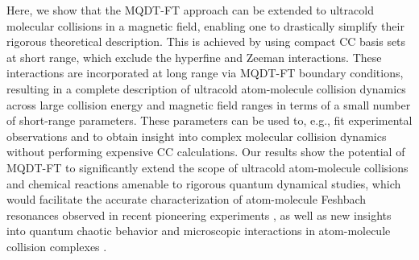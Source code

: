 \documentclass[reprint,amssymb,noeprint,twocolumn,longbibliography]{revtex4-2}
\begin{document}
Here, we show that the MQDT-FT approach can be extended to ultracold molecular collisions in a magnetic field, enabling one to drastically simplify their rigorous theoretical description. This is achieved by using compact CC basis sets at short range, which exclude the hyperfine and Zeeman interactions. These interactions are incorporated at long range via MQDT-FT boundary conditions, resulting in a complete description of ultracold atom-molecule collision dynamics across large collision energy and magnetic field ranges in terms of a small number of short-range parameters. %
These parameters can be used to, e.g., fit experimental observations and to obtain insight into complex molecular collision dynamics without performing expensive CC calculations. 
Our results show the potential of MQDT-FT to significantly extend the scope of ultracold atom-molecule collisions and chemical reactions amenable to rigorous quantum dynamical studies, which would facilitate the accurate characterization of atom-molecule Feshbach resonances observed in recent pioneering experiments \cite{Yang_19,Wang_21,Son_22,Park:23b}, as well as new insights into quantum chaotic behavior and microscopic interactions in atom-molecule collision complexes \cite{Croft_17}. 
\end{document}
